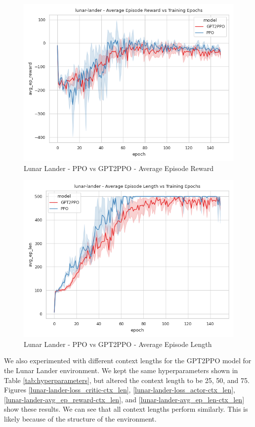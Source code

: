 \documentclass[conference]{IEEEtran}
\begin{document}
\begin{figure}[htbp]
    \centerline{\includegraphics[width=\columnwidth]{./img/lunar-lander-avg_ep_reward-model.png}}
    \caption{Lunar Lander - PPO vs GPT2PPO - Average Episode Reward}
    \label{lunar-lander-avg_ep_reward-model}
\end{figure}
\begin{figure}[htbp]
    \centerline{\includegraphics[width=\columnwidth]{./img/lunar-lander-avg_ep_len-model.png}}
    \caption{Lunar Lander - PPO vs GPT2PPO - Average Episode Length}
    \label{lunar-lander-avg_ep_len-model}
\end{figure}


We also experimented with different context lengths for the GPT2PPO model for the Lunar Lander environment. We kept the same hyperparameters shown in Table \ref{tab:hyperparameters}, but altered the context length to be 25, 50, and 75.
Figures \ref{lunar-lander-loss_critic-ctx_len}, \ref{lunar-lander-loss_actor-ctx_len}, \ref{lunar-lander-avg_ep_reward-ctx_len}, and \ref{lunar-lander-avg_ep_len-ctx_len} show these results. We can see that all context lengths perform similarly. This is likely because of the structure of the environment.
\end{document}
